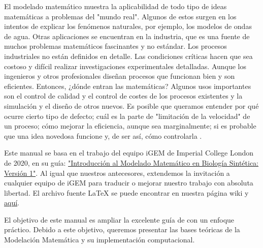 \documentclass[11pt, letterpaper, spanish]{article}
\begin{document}
\par{El modelado matemático muestra la aplicabilidad de todo tipo de ideas matemáticas a problemas del "mundo real". Algunos de estos surgen en los intentos de explicar los fenómenos naturales, por ejemplo, los modelos de ondas de agua. Otras aplicaciones se encuentran en la industria, que es una fuente de muchos problemas matemáticos fascinantes y no estándar. Los procesos industriales no están definidos en detalle. Las condiciones críticas hacen que sea costoso y difícil realizar investigaciones experimentales detalladas. Aunque los ingenieros y otros profesionales diseñan procesos que funcionan bien y son eficientes. Entonces, ¿dónde entran las matemáticas? Algunos usos importantes son el control de calidad y el control de costes de los procesos existentes y la simulación y el diseño de otros nuevos. Es posible que queramos entender por qué ocurre cierto tipo de defecto; cuál es la parte de "limitación de la velocidad" de un proceso; cómo mejorar la eficiencia, aunque sea marginalmente; si es probable que una idea novedosa funcione y, de ser así, cómo controlarla \cite{Howison_2008}.}

\par{Este manual se basa en el trabajo del equipo iGEM de Imperial College London de 2020, en su guía: \href{https://static.igem.org/mediawiki/2020/9/96/T--Imperial_College--introtomodelling.pdf}{"Introducción al Modelado Matemático en Biología Sintética: Versión 1"}. Al igual que nuestros antecesores, extendemos la invitación a cualquier equipo de iGEM para traducir o mejorar nuestro trabajo con absoluta libertad. El archivo fuente LaTeX se puede encontrar en nuestra página wiki y \href{https://github.com/Rexmali/iGEM-UAM2022}{aquí}.}

\par{El objetivo de este manual es ampliar la excelente guía de \cite{igem_2020} con un enfoque práctico. Debido a este objetivo, queremos presentar las bases teóricas de la Modelación Matemática y su implementación computacional.}

\newpage 
\end{document}
